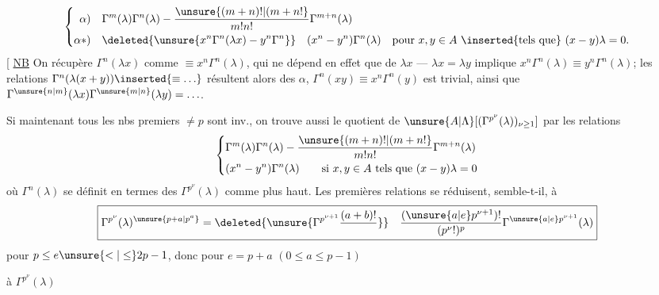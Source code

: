 \[
\left\{\begin{aligned}
\alpha)\quad&\Gamma^m(\lambda)\Gamma^n(\lambda)-\frac{\unsure{(m+n)!|(m+n!}}{m!n!}\Gamma^{m+n}(\lambda)\\
\alpha*)\quad&\deleted{\unsure{x^n\Gamma^n(\lambda x)-y^n\Gamma^n}}\quad(x^n-y^n)\Gamma^n(\lambda)\quad\text{pour }x,y\in A\ \inserted{\text{tels que}}\ (x-y)\lambda=0.
\end{aligned}\right.
\]
[ \uline{NB} On récupère $\Gamma^n(\lambda x)$ comme $\equiv x^n\Gamma^n(\lambda)$,
qui  ne dépend en effet que de $\lambda x$ ---   $\lambda x=\lambda y$ implique $x^n\Gamma^n(\lambda)\equiv y^n\Gamma^n(\lambda)$;
les relations $\Gamma^n(\lambda(x+y))\inserted{\equiv\ldots}$ résultent alors des $\alpha$,
$\Gamma^n(xy)\equiv x^n\Gamma^n(y)$ est trivial, ainsi que $\Gamma^{\unsure{n|m}}(\lambda x)\Gamma^{\unsure{m|n}}(\lambda y)=\ldots$.

Si maintenant tous les nbs premiers $\ne p$ sont inv., on trouve aussi le quotient de $\unsure{A|\Lambda}[(\Gamma^{p^\nu}(\lambda))_{\nu\geq1}]$ par les relations
\[
\left\{\begin{aligned}
&\Gamma^m(\lambda)\Gamma^n(\lambda)-\frac{\unsure{(m+n)!|(m+n!}}{m!n!}\Gamma^{m+n}(\lambda)\\
&(x^n-y^n)\Gamma^n(\lambda)\qquad\text{si }x,y\in A\text{ tels que }(x-y)\lambda=0
\end{aligned}\right.
\]
où $\Gamma^n(\lambda)$ se définit en termes des $\Gamma^{p^\nu}(\lambda)$ comme plus haut. Les premières relations se réduisent, semble-t-il, à
\[
\boxed{\Gamma^{p^\nu}(\lambda)^{\unsure{p+a|p^a}}=\deleted{\unsure{\Gamma^{p^{\nu+1}}\frac{(a+b)!}{}}}\quad\frac{(\unsure{a|e}p^{\nu+1})!}{(p^\nu!)^p}\Gamma^{\unsure{a|e}p^{\nu+1}}(\lambda)}
\]
pour $p\leq e\unsure{<|\leq}2p-1$, donc pour $e=p+a$ $(0\leq a\leq p-1)$

à $\Gamma^{p^\nu}(\lambda)$
